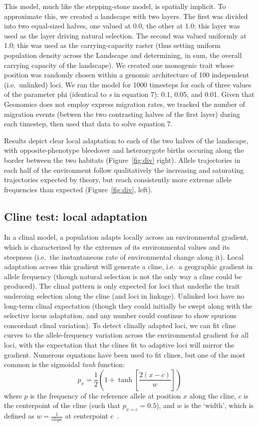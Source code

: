 ﻿\documentclass{article}
\begin{document}
This model, much like the stepping-stone model, is spatially implicit.
To approximate this, we created a landscape with two layers.
The first was divided into two equal-sized halves, one valued at 0.0, the other at 1.0;
this layer was used as the layer driving natural selection.
The second was valued uniformly at 1.0; this was used as the carrying-capacity raster
(thus setting uniform population density across the Landscape and determining,
in sum, the overall carrying capacity of the landscape).
We created one monogenic trait whose position was randomly chosen within a 
genomic architecture of 100 independent (i.e.\ unlinked) loci.
We ran the model for 1000 timesteps for each of three values of the parameter phi
(identical to \emph{s} in equation 7): 0.1, 0.05, and 0.01.
Given that Geonomics does not employ express migration rates,
we tracked the number of migration events (betwen the two contrasting halves of the first layer)
during each timestep, then used that data to solve equation 7.

Results depict clear local adaptation to each of the two halves of the landscape,
with opposite-phenotype bleedover and heterozygote births occuring along
the border between the two habitats (Figure~\ref{fig:div} right).
Allele trajectories in each half of the environment follow qualitatively 
the increasing and saturating trajectories expected by theory,
but reach consistently more extreme allele frequencies than expected (Figure~\ref{fig:div}, left).


\subsection{Cline test: local adaptation}
In a clinal model, a population adapts locally across an environmental gradient,
which is characterized by the extremes of its environmental values and its steepness
(i.e.\ the instantaneous rate of environmental change along it).
Local adaptation across this gradient will generate a cline,
i.e.\ a geographic gradient in allele frequency
(though natural selection is not the only way a cline could be produced).
The clinal pattern is only expected for loci that underlie the trait underoing
selection along the cline (and loci in linkage).
Unlinked loci have no long-term clinal expectation
(though they could initially be swept along with the selective locus adaptation,
and any number could continue to show spurious concordant clinal variation).
To detect clinally adapted loci, we can fit cline curves to the allele-frequency
variation across the environmental gradient for all loci,
with the expectation that the clines fit to adaptive loci will mirror the gradient.
Numerous equations have been used to fit clines, but one of the most common
is the sigmoidal \emph{tanh} function:
\begin{equation}
p_{x} = \frac{1}{2}(1 + \tanh[\frac{2(x - c)}{w}])
\end{equation}
where $p$ is the frequency of the reference allele at position $x$ along the cline,
$c$ is the centerpoint of the cline (such that $p_{x=c} = 0.5$), and $w$ is the 
`width', which is defined as $w = \frac{1}{slope}$ at centerpoint $c$~\cite{porter}. 
\end{document}
